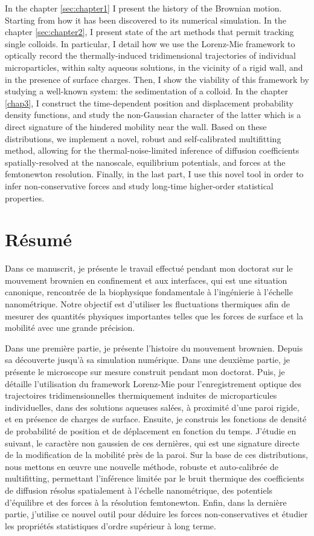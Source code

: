 In the chapter \ref{sec:chapter1} I present the history of the Brownian motion. Starting from how it has been discovered to its numerical simulation. In the chapter \ref{sec:chapter2}, I present state of the art methods that permit tracking single colloids. In particular, I detail how we use the Lorenz-Mie framework to optically record the thermally-induced tridimensional trajectories of individual microparticles, within salty aqueous solutions, in the vicinity of a rigid wall, and in the presence of surface charges. Then, I show the viability of this framework by studying a well-known system: the sedimentation of a colloid. In the chapter \ref{chap3}, I construct the time-dependent position and displacement probability density functions, and study the non-Gaussian character of the latter which is a direct signature of the hindered mobility near the wall. Based on these distributions, we implement a novel, robust and self-calibrated multifitting method, allowing for the thermal-noise-limited inference of diffusion coefficients spatially-resolved at the nanoscale, equilibrium potentials, and forces at the femtonewton resolution. Finally, in the last part, I use this novel tool in order to infer non-conservative forces and study long-time higher-order statistical properties.


\section*{Résumé}

Dans ce manuscrit, je présente le travail effectué pendant mon doctorat sur le mouvement brownien en confinement et aux interfaces, qui est une situation canonique, rencontrée de la biophysique fondamentale à l'ingénierie à l'échelle nanométrique.  Notre objectif est d'utiliser les fluctuations thermiques afin de mesurer des quantités physiques importantes telles que les forces de surface et la mobilité avec une grande précision.


Dans une première partie, je présente l'histoire du mouvement brownien.  Depuis sa découverte jusqu'à sa simulation numérique. Dans une deuxième partie, je présente le microscope sur mesure construit pendant mon doctorat.  Puis, je détaille l'utilisation du framework Lorenz-Mie pour l'enregistrement optique des trajectoires tridimensionnelles thermiquement induites de microparticules individuelles, dans des solutions aqueuses salées, à proximité d'une paroi rigide, et en présence de charges de surface. Ensuite, je construis les fonctions de densité de probabilité de position et de déplacement en fonction du temps. J'étudie en suivant, le caractère non gaussien de ces dernières, qui est une signature directe de la modification de la mobilité près de la paroi.  Sur la base de ces distributions, nous mettons en œuvre une nouvelle méthode, robuste et auto-calibrée de multifitting, permettant l'inférence limitée par le bruit thermique des coefficients de diffusion résolus spatialement à l'échelle nanométrique, des potentiels d'équilibre et des forces à la résolution femtonewton. Enfin, dans la dernière partie, j'utilise ce nouvel outil pour déduire les forces non-conservatives et étudier les propriétés statistiques d'ordre supérieur à long terme.




